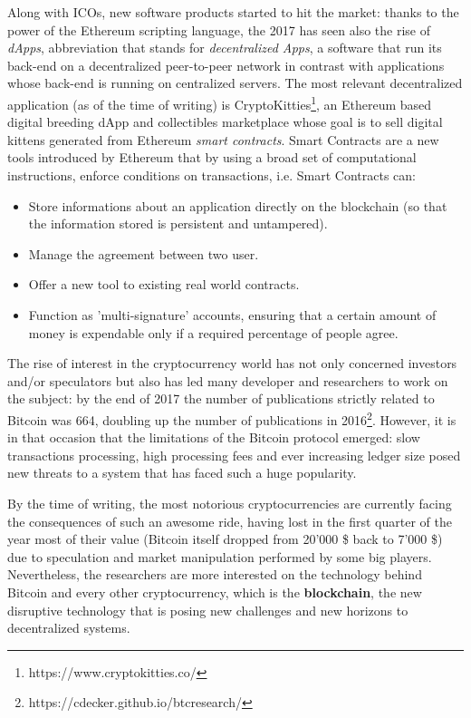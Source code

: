 		Along with ICOs, new software products started to hit the market: thanks to the power of the Ethereum\cite{Buterin2014} scripting language, the 2017 has seen also the rise of \textit{dApps}, abbreviation that stands for \textit{decentralized Apps}, a software that run its back-end  on a decentralized peer-to-peer network in contrast with applications whose back-end is running on centralized servers. The most relevant decentralized application (as of the time of writing) is CryptoKitties\footnote{https://www.cryptokitties.co/}, an Ethereum based digital breeding dApp and collectibles marketplace whose goal is to sell digital kittens generated from Ethereum \textit{smart contracts}. Smart Contracts are a new tools introduced by Ethereum that by using a broad set of computational instructions, enforce conditions on transactions, i.e. Smart Contracts can:
		\begin{itemize}
			\item Store informations about an application directly on the blockchain (so that the information stored is persistent and untampered).
			\item Manage the agreement between two user.
			\item Offer a new tool to existing real world contracts.
			\item Function as 'multi-signature' accounts, ensuring that a certain amount of money is expendable only if a required percentage of people agree.
		\end{itemize}
		The rise of interest in the cryptocurrency world has not only concerned investors and/or speculators but also has led many developer and researchers to work on the subject: by the end of 2017 the number of publications strictly related to Bitcoin was 664, doubling up the number of publications in 2016\footnote{https://cdecker.github.io/btcresearch/}. However, it is in that occasion that the limitations of the Bitcoin protocol emerged: slow transactions processing, high processing fees and ever increasing ledger size posed new threats to a system that has faced such a huge popularity.
		
		By the time of writing, the most notorious cryptocurrencies are currently facing the consequences of such an awesome ride, having lost in the first quarter of the year most of their value (Bitcoin itself dropped from 20'000 \$ back to 7'000 \$) due to speculation and market manipulation performed by some big players.  Nevertheless, the researchers are more interested on the technology behind Bitcoin and every other cryptocurrency, which is the \textbf{blockchain}, the new disruptive technology that is posing new challenges and new horizons to decentralized systems. 
		
